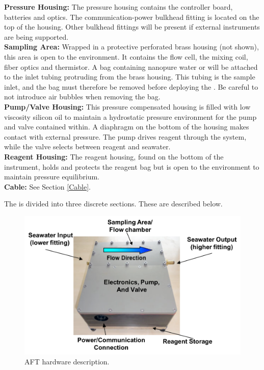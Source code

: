     \textbf{Pressure Housing:} The pressure housing contains the controller board, batteries and optics. The communication-power bulkhead fitting is located on the top of the housing. Other bulkhead fittings will be present if external instruments are being supported.\\
    
    \textbf{Sampling Area:} Wrapped in a protective perforated brass housing (not shown), this area is open to the environment. It contains the flow cell, the mixing coil, fiber optics and thermistor. A bag containing nanopure water or  will be attached to the inlet tubing protruding from the brass housing. This tubing is the sample inlet, and the bag must therefore be removed before deploying the \instType{}. Be careful to not introduce air bubbles when removing the bag.\\
    
    \textbf{Pump/Valve Housing:} This pressure compensated housing is filled with low viscosity silicon oil to maintain a hydrostatic pressure environment for the pump and valve contained within. A diaphragm on the bottom of the housing makes contact with external pressure. The pump drives reagent through the system, while the valve selects between reagent and seawater.\\
    
    \textbf{Reagent Housing:} The reagent housing, found on the bottom of the instrument, holds and protects the reagent bag but is open to the environment to maintain pressure equilibrium.\\
    
    \textbf{Cable:} See Section \ref{Cable}.

\or			%
    The \instType{} is divided into three discrete sections. These are described below.
    
    \begin{figure}[ht]
    \centering
    \includegraphics[height=0.4\textheight]{figs/AFT_pic.png}
    \caption{AFT hardware description.}
    \label{fig:AFT}
    \end{figure}

